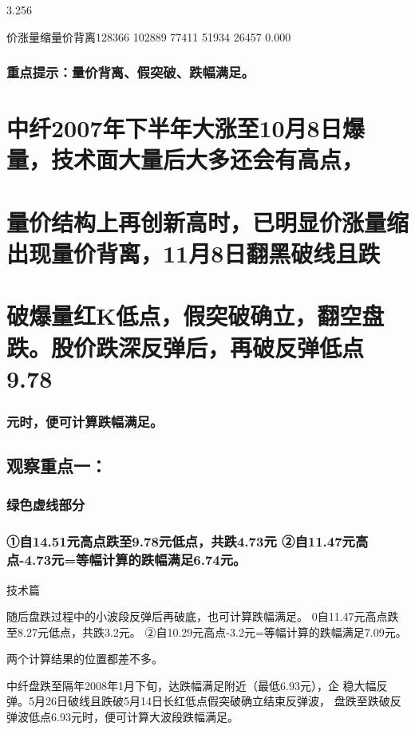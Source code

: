 \documentclass{article}
\begin{document}
3.256

价涨量缩量价背离128366 102889 77411 51934 26457 0.000

\subsubsection{重点提示：量价背离、假突破、跌幅满足。}

\section{中纤2007年下半年大涨至10月8日爆量，技术面大量后大多还会有高点，}

\section{量价结构上再创新高时，已明显价涨量缩出现量价背离，11月8日翻黑破线且跌}

\section{破爆量红K低点，假突破确立，翻空盘跌。股价跌深反弹后，再破反弹低点9.78}

\subsubsection{元时，便可计算跌幅满足。}

\subsection{观察重点一：}

\subsubsection{绿色虚线部分}

\subsubsection{①自14.51元高点跌至9.78元低点，共跌4.73元 ②自11.47元高点-4.73元=等幅计算的跌幅满足6.74元。}

\clearpage

技术篇

随后盘跌过程中的小波段反弹后再破底，也可计算跌幅满足。 0自11.47元高点跌至8.27元低点，共跌3.2元。 ②自10.29元高点-3.2元=等幅计算的跌幅满足7.09元。

两个计算结果的位置都差不多。

中纤盘跌至隔年2008年1月下旬，达跌幅满足附近（最低6.93元），企 稳大幅反弹。5月26日破线且跌破5月14日长红低点假突破确立结束反弹波， 盘跌至跌破反弹波低点6.93元时，便可计算大波段跌幅满足。
\end{document}
